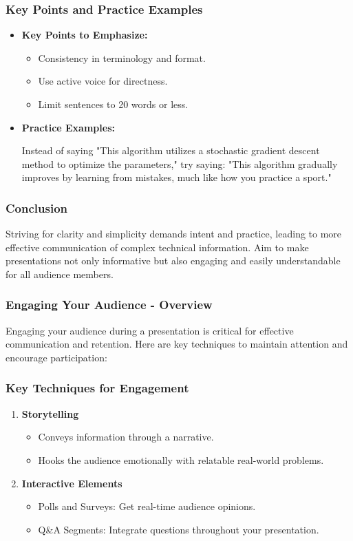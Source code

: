 \documentclass[aspectratio=169]{beamer}
\begin{document}
\begin{frame}[fragile]
    \frametitle{Key Points and Practice Examples}
    \begin{itemize}
        \item \textbf{Key Points to Emphasize:}
        \begin{itemize}
            \item Consistency in terminology and format.
            \item Use active voice for directness.
            \item Limit sentences to 20 words or less.
        \end{itemize}

        \item \textbf{Practice Examples:}
        \begin{example}
            Instead of saying "This algorithm utilizes a stochastic gradient descent method to optimize the parameters," try saying: "This algorithm gradually improves by learning from mistakes, much like how you practice a sport."
        \end{example}
    \end{itemize}
\end{frame}

\begin{frame}[fragile]
    \frametitle{Conclusion}
    Striving for clarity and simplicity demands intent and practice, leading to more effective communication of complex technical information. Aim to make presentations not only informative but also engaging and easily understandable for all audience members.
\end{frame}

\begin{frame}[fragile]
  \frametitle{Engaging Your Audience - Overview}
  Engaging your audience during a presentation is critical for effective communication and retention. Here are key techniques to maintain attention and encourage participation:
\end{frame}

\begin{frame}[fragile]
  \frametitle{Key Techniques for Engagement}
  \begin{enumerate}
    \item \textbf{Storytelling}
      \begin{itemize}
        \item Conveys information through a narrative.
        \item Hooks the audience emotionally with relatable real-world problems.
      \end{itemize}
    \item \textbf{Interactive Elements}
      \begin{itemize}
        \item Polls and Surveys: Get real-time audience opinions.
        \item Q\&A Segments: Integrate questions throughout your presentation.
      \end{itemize}
  \end{enumerate}
\end{frame}
\end{document}
